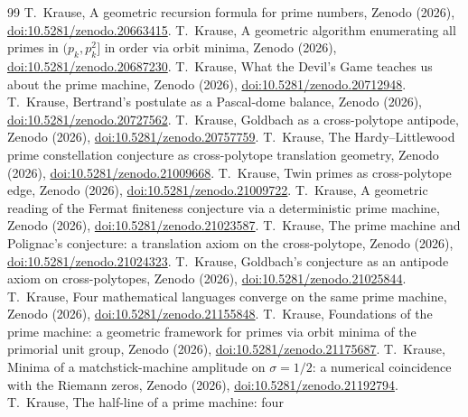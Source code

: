 \documentclass[11pt,a4paper]{article}
\theoremstyle{plain}
\theoremstyle{definition}
\theoremstyle{remark}
\begin{document}
\begin{thebibliography}{99}
 T.~Krause, A geometric recursion formula for prime
numbers, Zenodo (2026),
\href{https://doi.org/10.5281/zenodo.20663415}{doi:10.5281/zenodo.20663415}.
 T.~Krause, A geometric algorithm enumerating all primes in
$(p_k,p_k^2]$ in order via orbit minima, Zenodo (2026),
\href{https://doi.org/10.5281/zenodo.20687230}{doi:10.5281/zenodo.20687230}.
 T.~Krause, What the Devil's Game teaches us about the prime
machine, Zenodo (2026),
\href{https://doi.org/10.5281/zenodo.20712948}{doi:10.5281/zenodo.20712948}.
 T.~Krause, Bertrand's postulate as a Pascal-dome balance,
Zenodo (2026),
\href{https://doi.org/10.5281/zenodo.20727562}{doi:10.5281/zenodo.20727562}.
 T.~Krause, Goldbach as a cross-polytope antipode, Zenodo
(2026), \href{https://doi.org/10.5281/zenodo.20757759}{doi:10.5281/zenodo.20757759}.
 T.~Krause, The Hardy--Littlewood prime constellation conjecture
as cross-polytope translation geometry, Zenodo (2026),
\href{https://doi.org/10.5281/zenodo.21009668}{doi:10.5281/zenodo.21009668}.
 T.~Krause, Twin primes as cross-polytope edge, Zenodo (2026),
\href{https://doi.org/10.5281/zenodo.21009722}{doi:10.5281/zenodo.21009722}.
 T.~Krause, A geometric reading of the Fermat finiteness
conjecture via a deterministic prime machine, Zenodo (2026),
\href{https://doi.org/10.5281/zenodo.21023587}{doi:10.5281/zenodo.21023587}.
 T.~Krause, The prime machine and Polignac's conjecture: a
translation axiom on the cross-polytope, Zenodo (2026),
\href{https://doi.org/10.5281/zenodo.21024323}{doi:10.5281/zenodo.21024323}.
 T.~Krause, Goldbach's conjecture as an antipode axiom on
cross-polytopes, Zenodo (2026),
\href{https://doi.org/10.5281/zenodo.21025844}{doi:10.5281/zenodo.21025844}.
 T.~Krause, Four mathematical languages converge on the same
prime machine, Zenodo (2026),
\href{https://doi.org/10.5281/zenodo.21155848}{doi:10.5281/zenodo.21155848}.
 T.~Krause, Foundations of the prime machine: a
geometric framework for primes via orbit minima of the primorial unit group,
Zenodo (2026),
\href{https://doi.org/10.5281/zenodo.21175687}{doi:10.5281/zenodo.21175687}.
 T.~Krause, Minima of a matchstick-machine amplitude on
$\sigma=1/2$: a numerical coincidence with the Riemann zeros, Zenodo (2026),
\href{https://doi.org/10.5281/zenodo.21192794}{doi:10.5281/zenodo.21192794}.
 T.~Krause, The half-line of a prime machine: four

\end{thebibliography}
\end{document}
